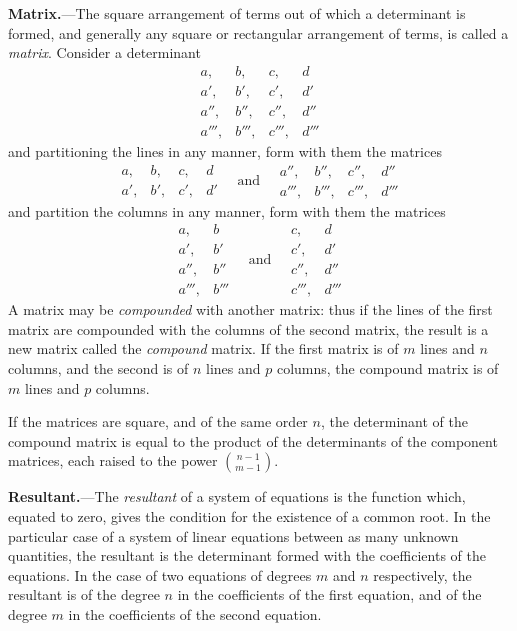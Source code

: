 \documentclass[11pt,a4paper]{book}
\begin{document}
\vspace{1em}

\noindent\textbf{Matrix.}---The square arrangement of terms out of which a determinant is formed, and generally any square or rectangular arrangement of terms, is called a \textit{matrix}. Consider a determinant
\[
\begin{array}{cccc}
a, & b, & c, & d \\
a', & b', & c', & d' \\
a'', & b'', & c'', & d'' \\
a''', & b''', & c''', & d'''
\end{array}
\]
and partitioning the lines in any manner, form with them the matrices
\[
\begin{array}{cccc}
a, & b, & c, & d \\
a', & b', & c', & d'
\end{array}
\quad\text{and}\quad
\begin{array}{cccc}
a'', & b'', & c'', & d'' \\
a''', & b''', & c''', & d'''
\end{array}
\]
and partition the columns in any manner, form with them the matrices
\[
\begin{array}{cc}
a, & b \\
a', & b' \\
a'', & b'' \\
a''', & b'''
\end{array}
\quad\text{and}\quad
\begin{array}{cc}
c, & d \\
c', & d' \\
c'', & d'' \\
c''', & d'''
\end{array}
\]
A matrix may be \textit{compounded} with another matrix: thus if the lines of the first matrix are compounded with the columns of the second matrix, the result is a new matrix called the \textit{compound} matrix. If the first matrix is of $m$ lines and $n$ columns, and the second is of $n$ lines and $p$ columns, the compound matrix is of $m$ lines and $p$ columns.

If the matrices are square, and of the same order $n$, the determinant of the compound matrix is equal to the product of the determinants of the component matrices, each raised to the power $\binom{n-1}{m-1}$.

\vspace{1em}

\noindent\textbf{Resultant.}---The \textit{resultant} of a system of equations is the function which, equated to zero, gives the condition for the existence of a common root. In the particular case of a system of linear equations between as many unknown quantities, the resultant is the determinant formed with the coefficients of the equations. In the case of two equations of degrees $m$ and $n$ respectively, the resultant is of the degree $n$ in the coefficients of the first equation, and of the degree $m$ in the coefficients of the second equation.
\end{document}
